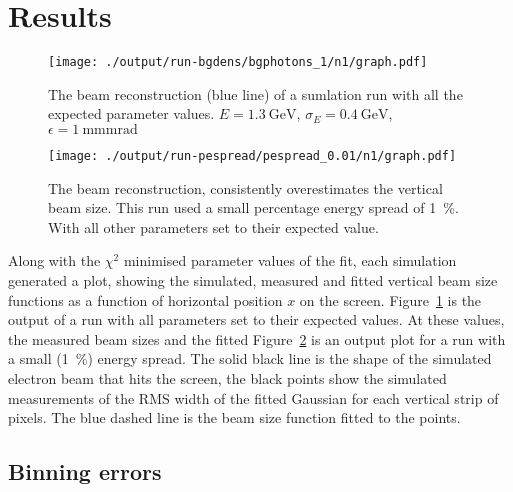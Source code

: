 
\section{Results}
\label{sec:results}


\begin{figure}[!tb]
	\centering
	\texttt{[image: ./output/run-bgdens/bgphotons\_1/n1/graph.pdf]}
	\caption{
		The beam reconstruction (blue line) of a sumlation run with all the
		expected parameter values. \(E = \SI{1.3}{\giga\electronvolt}\),
		\(\sigma_E = \SI{0.4}{\giga\electronvolt}\), \(\epsilon =
		\SI{1}{\milli\meter\milli\radian}\)
	}
	\label{fig:default}
\end{figure}

\begin{figure}[!tb]
	\centering
	\texttt{[image: ./output/run-pespread/pespread\_0.01/n1/graph.pdf]}
	\caption{
		The beam reconstruction, consistently overestimates the vertical
		beam size. This run used a small percentage energy spread of
		\SI{1}{\percent}. With all other parameters set to their expected
		value.
	}
	\label{fig:yoverestimate}
\end{figure}


Along with the \(\chi^2\) minimised parameter values of the fit, each simulation
generated a plot, showing the simulated, measured and fitted vertical beam size
functions as a function of horizontal position \(x\) on the screen.
Figure~\ref{fig:default} is the output of a run with all parameters set to their
expected values. At these values, the measured beam sizes and the fitted
Figure~\ref{fig:yoverestimate} is an output plot for a run with a small
(\SI{1}{\percent}) energy spread. The solid black line is the shape of the
simulated electron beam that hits the screen, the black points show the
simulated measurements of the RMS width of the fitted Gaussian for each vertical
strip of pixels. The blue dashed line is the beam size function fitted to the
points.

\subsection{Binning errors}

